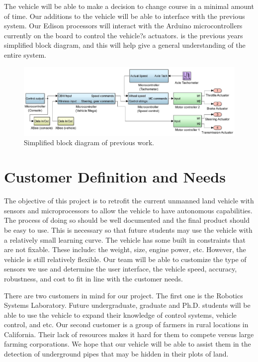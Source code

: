 The vehicle will be able to make a decision to change course in a minimal amount of time.  Our additions to the vehicle will be able to interface with the previous system.  Our Edison processors will interact with the Arduino microcontrollers currently on the board to control the vehicle?s actuators.  is the previous years simplified block diagram, and this will help give a general understanding of the entire system.
\begin{figure}[h!]
\begin{center}
\includegraphics[width=\textwidth]{Figures/PreviousCBD.png}
\caption[Previous Year's Component Block Diagram]{Simplified block diagram of previous work.}
\label{oldBlock}
\end{center}
\end{figure}


\section{Customer Definition and Needs}
The objective of this project is to retrofit the current unmanned land vehicle with sensors and microprocessors to allow the vehicle to have autonomous capabilities.  The process of doing so should be well documented and the final product should be easy to use.  This is necessary so that future students may use the vehicle with a relatively small learning curve.  The vehicle has some built in constraints that are not fixable. These include: the weight, size, engine power, etc.  However, the vehicle is still relatively flexible.  Our team will be able to customize the type of sensors we use and determine the user interface, the vehicle speed, accuracy, robustness, and cost to fit in line with the customer needs.

    There are two customers in mind for our project.  The first one is the Robotics Systems Laboratory.  Future undergraduate, graduate and Ph.D. students will be able to use the vehicle to expand their knowledge of control systems, vehicle control, and etc.  Our second customer is a group of farmers in rural locations in California.  Their lack of resources makes it hard for them to compete versus large farming corporations.  We hope that our vehicle will be able to assist them in the detection of underground pipes that may be hidden in their plots of land.  
    
